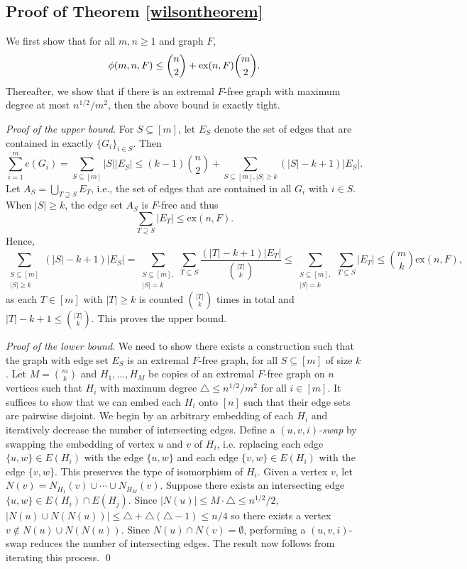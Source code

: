 \documentclass[12pt]{article}
\newcommand*{\ex}{\textnormal{ex}}
\begin{document}
\subsection{Proof of Theorem \ref{wilsontheorem}} 

We first show that for all 
$m,n \geq 1$ and graph $F$, 
\[  \phi(m, n ,F) \leq \binom{n}{2} + \ex(n, F)\binom{m}{2}.
  \]
Thereafter, we show that if there is an extremal $F$-free graph with maximum degree at most $n^{1/2}/m^2$, then the above bound is exactly tight. 

\textit{Proof of the upper bound}. For $S \subseteq [m]$, let $E_S$ denote the set of edges that are contained in exactly $\{G_i\}_{i \in S}$. Then 
  \[
    \sum_{i = 1}^m e(G_i) = \sum_{S \subseteq [m]} |S||E_S| \leq (k - 1)\binom{n}{2} + \sum_{S \subseteq [m], |S| \geq k} (|S| - k + 1)|E_S|.
  \]
  Let $A_S = \bigcup_{T \supseteq S} E_T$, i.e., the set of edges that are contained in all $G_i$ with $i \in S$. When $|S| \geq k$, the edge set $A_S$ is $F$-free and thus 
  \[
    \sum_{T \supseteq S} |E_T| \leq \text{ex}(n, F).
  \]
  Hence,
  \[
    \sum_{\substack{S \subseteq [m] \\ |S| \geq k}} (|S| - k + 1)|E_S| = \sum_{\substack{S \subseteq [m], \\ |S| = k}} \sum_{T \subseteq S} \frac{(|T| - k + 1)|E_T|}{\binom{|T|}{k}} \leq \sum_{\substack{S \subseteq [m], \\ |S| = k}} \sum_{T \subseteq S} |E_T| \leq \binom{m}{k}\text{ex}(n, F),
  \]
  as each $T \in [m]$ with $|T| \geq k$ is counted $\binom{|T|}{k}$ times in total and $|T| - k + 1 \leq \binom{|T|}{k}$. This proves the upper bound.

 \textit{Proof of the lower bound}. We need to show there exists a construction such that the graph with edge set $E_S$ is an extremal $F$-free graph, for all $S \subseteq [m]$ of size $k$. Let $M = \binom{m}{k}$ and $H_1, \ldots, H_M$ be copies of an extremal $F$-free graph on $n$ vertices such that $H_i$ with maximum degree $\triangle \leq n^{1/2}/m^2$ for all $i \in [m]$. It suffices to show that we can embed each $H_i$ onto $[n]$ such that their edge sets are pairwise disjoint. We begin by an arbitrary embedding of each $H_i$ and iteratively decrease the number of intersecting edges. Define a \textit{$(u, v, i)$-swap} by swapping the embedding of vertex $u$ and $v$ of $H_i$, i.e. replacing each edge $\{u, w\} \in E(H_i)$ with the edge $\{u, w\}$ and each edge $\{v, w\} \in E(H_i)$ with the edge $\{v, w\}$. This preserves the type of isomorphism of $H_i$. Given a vertex $v$, let $N(v) = N_{H_1}(v) \cup \cdots \cup N_{H_M}(v)$. Suppose there exists an intersecting edge $\{u, w\} \in E(H_i) \cap E(H_j)$. Since $|N(u)|
  \leq M \cdot \triangle \leq n^{1/2}/2$, $|N(u) \cup N(N(u))| \leq \triangle + \triangle(\triangle - 1) \leq n/4$ so there exists a vertex $v \notin N(u) \cup N(N(u))$. Since $N(u) \cap N(v) = \emptyset$, performing a $(u, v, i)$-swap reduces the number of intersecting edges. The result now follows from iterating this process. \qed
\end{document}
